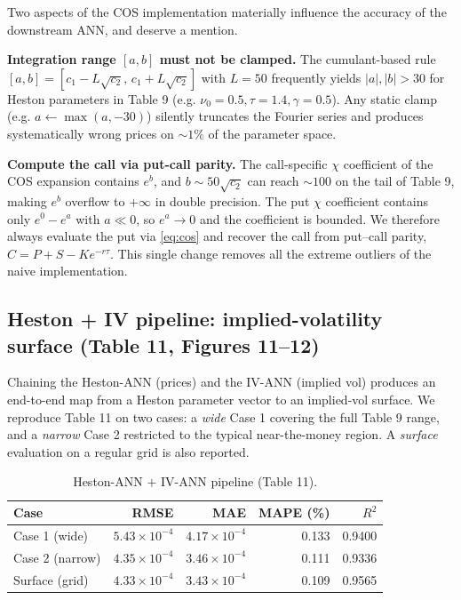 \documentclass[11pt,a4paper]{article}
\begin{document}
Two aspects of the COS implementation materially influence the accuracy of
the downstream ANN, and deserve a mention.

\textbf{Integration range $[a, b]$ must not be clamped.} The cumulant-based
rule $[a, b] = [c_1 - L\sqrt{c_2},\, c_1 + L\sqrt{c_2}]$ with $L = 50$
frequently yields $|a|, |b| > 30$ for Heston parameters in Table 9 (e.g.
$\nu_0 = 0.5, \tau = 1.4, \gamma = 0.5$). Any static clamp
(e.g. $a \leftarrow \max(a, -30)$) silently truncates the Fourier series and
produces systematically wrong prices on $\sim 1\%$ of the parameter space.

\textbf{Compute the call via put-call parity.} The call-specific
$\chi$ coefficient of the COS expansion contains $e^b$, and $b \sim 50
\sqrt{c_2}$ can reach $\sim 100$ on the tail of Table 9, making $e^b$
overflow to $+\infty$ in double precision. The put $\chi$ coefficient
contains only $e^0 - e^a$ with $a \ll 0$, so $e^a \to 0$ and the
coefficient is bounded. We therefore always evaluate the put via
\eqref{eq:cos} and recover the call from put--call parity,
$C = P + S - K e^{-r\tau}$. This single change removes all the extreme
outliers of the naive implementation.

\subsection{Heston + IV pipeline: implied-volatility surface (Table 11, Figures 11--12)}
\label{sec:surface}

Chaining the Heston-ANN (prices) and the IV-ANN (implied vol) produces an
end-to-end map from a Heston parameter vector to an implied-vol surface.
We reproduce Table 11 on two cases: a \emph{wide} Case 1 covering the
full Table 9 range, and a \emph{narrow} Case 2 restricted to the typical
near-the-money region. A \emph{surface} evaluation on a regular grid is
also reported.

\begin{table}[H]
\centering
\caption{Heston-ANN $+$ IV-ANN pipeline (Table 11).}
\label{tab:pipeline}
\begin{tabular}{lrrrr}
\toprule
\textbf{Case} & \textbf{RMSE} & \textbf{MAE} & \textbf{MAPE (\%)} & \textbf{$R^2$} \\
\midrule
Case 1 (wide)    & $5.43 \times 10^{-4}$ & $4.17 \times 10^{-4}$ & 0.133 & 0.9400 \\
Case 2 (narrow)  & $4.35 \times 10^{-4}$ & $3.46 \times 10^{-4}$ & 0.111 & 0.9336 \\
Surface (grid)   & $4.33 \times 10^{-4}$ & $3.43 \times 10^{-4}$ & 0.109 & 0.9565 \\
\bottomrule
\end{tabular}
\end{table}
\end{document}
